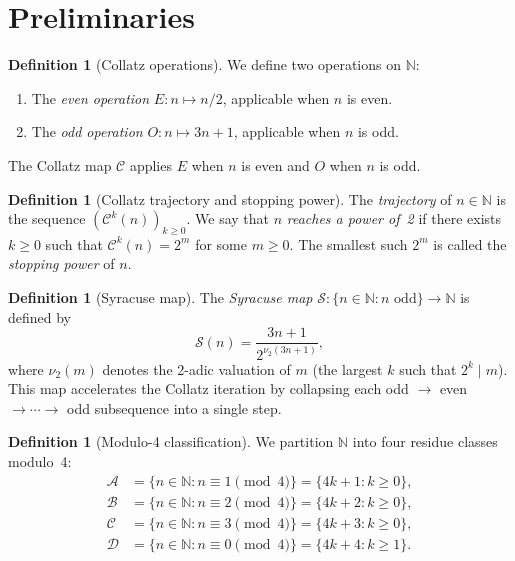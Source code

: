 \documentclass[11pt,a4paper]{article}
\theoremstyle{plain}
\theoremstyle{definition}
\newtheorem{definition}[theorem]{Definition}
\newcommand{\N}{\mathbb{N}}
\newcommand{\Cmap}{\mathcal{C}}
\newcommand{\Smap}{\mathcal{S}}
\begin{document}
\section{Preliminaries}
\label{sec:prelim}

\begin{definition}[Collatz operations]\label{def:operations}
  We define two operations on $\N$:
  \begin{enumerate}[label=(\alph*)]
    \item The \emph{even operation} $E: n \mapsto n/2$, applicable when $n$ is even.
    \item The \emph{odd operation} $O: n \mapsto 3n+1$, applicable when $n$ is odd.
  \end{enumerate}
  The Collatz map $\Cmap$ applies $E$ when $n$ is even and $O$ when $n$ is odd.
\end{definition}

\begin{definition}[Collatz trajectory and stopping power]\label{def:trajectory}
  The \emph{trajectory} of $n \in \N$ is the sequence $(\Cmap^k(n))_{k \geq 0}$. We say that $n$ \emph{reaches a power of~2} if there exists $k \geq 0$ such that $\Cmap^k(n) = 2^m$ for some $m \geq 0$. The smallest such $2^m$ is called the \emph{stopping power} of $n$.
\end{definition}

\begin{definition}[Syracuse map]\label{def:syracuse}
  The \emph{Syracuse map} $\Smap: \{n \in \N : n \text{ odd}\} \to \N$ is defined by
  \[
    \Smap(n) = \frac{3n+1}{2^{\nu_2(3n+1)}},
  \]
  where $\nu_2(m)$ denotes the 2-adic valuation of $m$ (the largest $k$ such that $2^k \mid m$). This map accelerates the Collatz iteration by collapsing each odd $\to$ even $\to \cdots \to$ odd subsequence into a single step.
\end{definition}

\begin{definition}[Modulo-4 classification]\label{def:classes}
  We partition $\N$ into four residue classes modulo~4:
  \begin{align*}
    \mathcal{A} &= \{n \in \N : n \equiv 1 \pmod{4}\} = \{4k+1 : k \geq 0\}, \\
    \mathcal{B} &= \{n \in \N : n \equiv 2 \pmod{4}\} = \{4k+2 : k \geq 0\}, \\
    \mathcal{C} &= \{n \in \N : n \equiv 3 \pmod{4}\} = \{4k+3 : k \geq 0\}, \\
    \mathcal{D} &= \{n \in \N : n \equiv 0 \pmod{4}\} = \{4k+4 : k \geq 1\}.
  \end{align*}
\end{definition}
\end{document}
